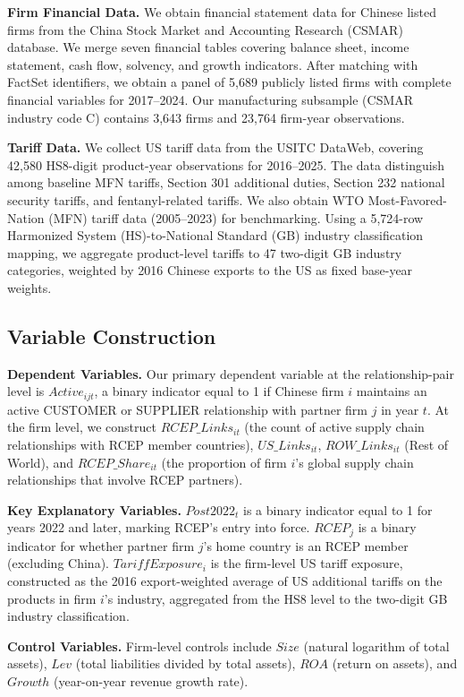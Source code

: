 \documentclass[preprint,12pt,authoryear]{elsarticle}
\begin{document}
\textbf{Firm Financial Data.} We obtain financial statement data for Chinese listed firms from the China Stock Market and Accounting Research (CSMAR) database. We merge seven financial tables covering balance sheet, income statement, cash flow, solvency, and growth indicators. After matching with FactSet identifiers, we obtain a panel of 5,689 publicly listed firms with complete financial variables for 2017--2024. Our manufacturing subsample (CSMAR industry code C) contains 3,643 firms and 23,764 firm-year observations.

\textbf{Tariff Data.} We collect US tariff data from the USITC DataWeb, covering 42,580 HS8-digit product-year observations for 2016--2025. The data distinguish among baseline MFN tariffs, Section 301 additional duties, Section 232 national security tariffs, and fentanyl-related tariffs. We also obtain WTO Most-Favored-Nation (MFN) tariff data (2005--2023) for benchmarking. Using a 5,724-row Harmonized System (HS)-to-National Standard (GB) industry classification mapping, we aggregate product-level tariffs to 47 two-digit GB industry categories, weighted by 2016 Chinese exports to the US as fixed base-year weights.

\subsection{Variable Construction}

\textbf{Dependent Variables.} Our primary dependent variable at the relationship-pair level is $Active_{ijt}$, a binary indicator equal to 1 if Chinese firm $i$ maintains an active CUSTOMER or SUPPLIER relationship with partner firm $j$ in year $t$. At the firm level, we construct $RCEP\_Links_{it}$ (the count of active supply chain relationships with RCEP member countries), $US\_Links_{it}$, $ROW\_Links_{it}$ (Rest of World), and $RCEP\_Share_{it}$ (the proportion of firm $i$'s global supply chain relationships that involve RCEP partners).

\textbf{Key Explanatory Variables.} $Post2022_t$ is a binary indicator equal to 1 for years 2022 and later, marking RCEP's entry into force. $RCEP_j$ is a binary indicator for whether partner firm $j$'s home country is an RCEP member (excluding China). $TariffExposure_i$ is the firm-level US tariff exposure, constructed as the 2016 export-weighted average of US additional tariffs on the products in firm $i$'s industry, aggregated from the HS8 level to the two-digit GB industry classification.

\textbf{Control Variables.} Firm-level controls include $Size$ (natural logarithm of total assets), $Lev$ (total liabilities divided by total assets), $ROA$ (return on assets), and $Growth$ (year-on-year revenue growth rate).
\end{document}

